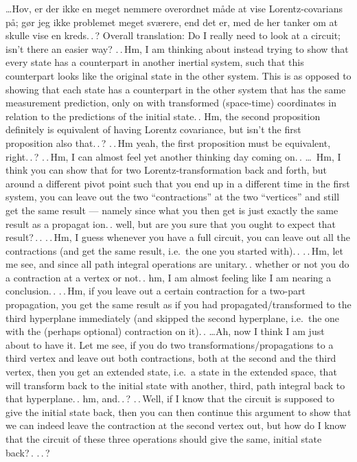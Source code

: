 \documentclass{report}
\begin{document}
\ldots Hov, er der ikke en meget nemmere overordnet måde at vise Lorentz-covarians på; gør jeg ikke problemet meget sværere, end det er, med de her tanker om at skulle vise en kreds.\,.\,? 
Overall translation: Do I really need to look at a circuit; isn't there an easier way?
.\,.\,Hm, I am thinking about instead trying to show that every state has a counterpart in another inertial system, such that this counterpart looks like the original state in the other system. This is as opposed to showing that each state has a counterpart in the other system that has the same measurement prediction, only on with transformed (space-time) coordinates in relation to the predictions of the initial state.\,. Hm, the second proposition definitely is equivalent of having Lorentz covariance, but isn't the first proposition also that.\,.\,? %
.\,.\,Hm yeah, the first proposition must be equivalent, right.\,.\,? .\,.\,Hm, I can almost feel yet another thinking day coming on.\,. 
\ldots\ Hm, I think you can show that for two Lorentz-transformation back and forth, but around a different pivot point such that you end up in a different time in the first system, you can leave out the two ``contractions'' at the two ``vertices'' and still get the same result --- namely since what you then get is just exactly the same result as a propagat%
ion.\,. well, but are you sure that you ought to expect that result?\,.\,. .\,.\,Hm, I guess whenever you have a full circuit, you can leave out all the contractions (and get the same result, i.e.\ the one you started with).\,. .\,.\,Hm, let me see, and since all path integral operations are unitary.\,. whether or not you do a contraction at a vertex or not.\,. hm, I am almost feeling like I am nearing a conclusion.\,. .\,.\,Hm, if you leave out a certain contraction for a two-part propagation, you get the same result as if you had propagated/transformed to the third hyperplane immediately (and skipped the second hyperplane, i.e.\ the one with the (perhaps optional) contraction on it).\,. %
\ldots Ah, now I think I am just about to have it. Let me see, if you do two transformations/propagations to a third vertex and leave out both contractions, both at the second and the third vertex, then you get an extended state, i.e.\ a state in the extended space, that will transform back to the initial state with another, third, path integral back to that hyperplane.\,. hm, and.\,.\,? .\,.\,Well, if I know that the circuit is supposed to give the initial state back, then you can then continue this argument to show that we can indeed leave the contraction at the second vertex out, but how do I know that the circuit of these three operations should give the same, initial state back?\,. .\,.\,?   
\end{document}
